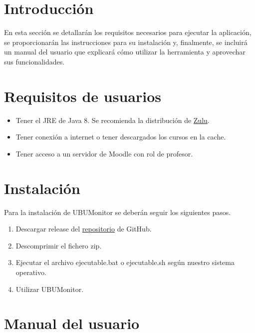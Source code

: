 
\section{Introducción}

En esta sección se detallarán los requisitos necesarios para ejecutar la aplicación, se proporcionarán las instrucciones para su instalación y, finalmente, se incluirá un manual del usuario que explicará cómo utilizar la herramienta y aprovechar sus funcionalidades.

\section{Requisitos de usuarios}

\begin{itemize}
    \item Tener el JRE de Java 8. Se recomienda la distribución de \href{https://www.azul.com/downloads/?version=java-8-lts&os=windows&architecture=x86-64-bit&package=jre#zulu}{Zulu}.
    \item Tener conexión a internet o tener descargados los cursos en la cache.
    \item Tener acceso a un servidor de Moodle con rol de profesor. 
\end{itemize}

\section{Instalación}

Para la instalación de UBUMonitor se deberán seguir los siguientes pasos.

\begin{enumerate}
    \item Descargar release del \href{https://github.com/CatalinMarc/UBUMonitor}{repositorio} de GitHub.
    \item Descomprimir el fichero zip.
    \item Ejecutar el archivo ejecutable.bat o ejecutable.sh según nuestro sistema operativo.
    \item Utilizar UBUMonitor.
\end{enumerate}

\section{Manual del usuario} \label{sec:manual}

